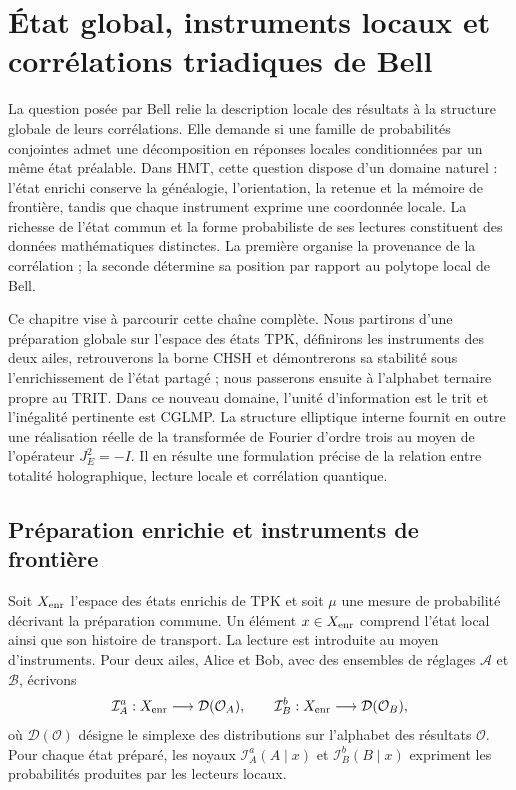 \section{État global, instruments locaux et corrélations triadiques de Bell}
\label{chap:bell-local-global}

La question posée par Bell \cite{Bell1964} relie la description locale des résultats à la structure globale de leurs corrélations. Elle demande si une famille de probabilités conjointes admet une décomposition en réponses locales conditionnées par un même état préalable. Dans HMT, cette question dispose d’un domaine naturel : l’état enrichi conserve la généalogie, l’orientation, la retenue et la mémoire de frontière, tandis que chaque instrument exprime une coordonnée locale. La richesse de l’état commun et la forme probabiliste de ses lectures constituent des données mathématiques distinctes. La première organise la provenance de la corrélation ; la seconde détermine sa position par rapport au polytope local de Bell.

Ce chapitre vise à parcourir cette chaîne complète. Nous partirons d’une préparation globale sur l’espace des états TPK, définirons les instruments des deux ailes, retrouverons la borne CHSH et démontrerons sa stabilité sous l’enrichissement de l’état partagé ; nous passerons ensuite à l’alphabet ternaire propre au TRIT. Dans ce nouveau domaine, l’unité d’information est le trit et l’inégalité pertinente est CGLMP. La structure elliptique interne fournit en outre une réalisation réelle de la transformée de Fourier d’ordre trois au moyen de l’opérateur \(J_E^2=-I\). Il en résulte une formulation précise de la relation entre totalité holographique, lecture locale et corrélation quantique.

\subsection{Préparation enrichie et instruments de frontière}

Soit \(X_{\rm enr}\) l’espace des états enrichis de TPK et soit \(\mu\) une mesure de probabilité décrivant la préparation commune. Un élément \(x\in X_{\rm enr}\) comprend l’état local ainsi que son histoire de transport. La lecture est introduite au moyen d’instruments. Pour deux ailes, Alice et Bob, avec des ensembles de réglages \(\mathcal A\) et \(\mathcal B\), écrivons
\[
 \mathcal I_A^a:X_{\rm enr}\longrightarrow\mathcal D(\mathcal O_A),
 \qquad
 \mathcal I_B^b:X_{\rm enr}\longrightarrow\mathcal D(\mathcal O_B),
\]
où \(\mathcal D(\mathcal O)\) désigne le simplexe des distributions sur l’alphabet des résultats \(\mathcal O\). Pour chaque état préparé, les noyaux \(\mathcal I_A^a(A\mid x)\) et \(\mathcal I_B^b(B\mid x)\) expriment les probabilités produites par les lecteurs locaux.

